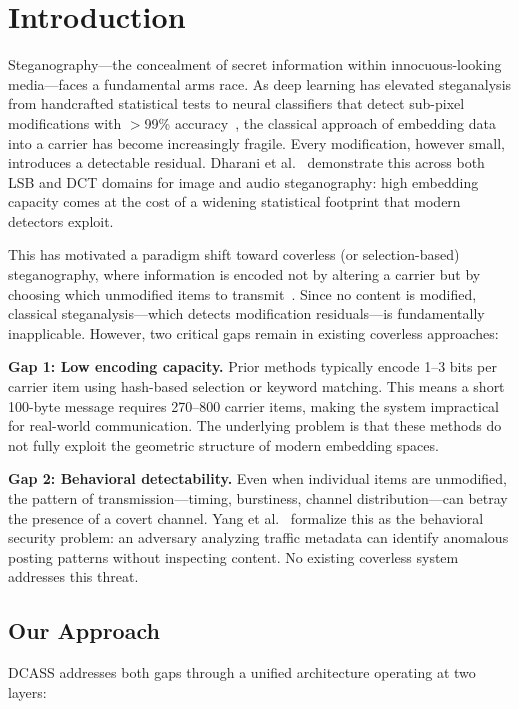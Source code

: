 \documentclass[conference]{IEEEtran}
\begin{document}
\section{Introduction}

Steganography---the concealment of secret information within innocuous-looking media---faces a fundamental arms race. As deep learning has elevated steganalysis from handcrafted statistical tests to neural classifiers that detect sub-pixel modifications with $>$99\% accuracy~\cite{boroumand2018deep,zhang2019run,ye2017deep}, the classical approach of embedding data into a carrier has become increasingly fragile. Every modification, however small, introduces a detectable residual. Dharani et al.~\cite{dharani2021comparative} demonstrate this across both LSB and DCT domains for image and audio steganography: high embedding capacity comes at the cost of a widening statistical footprint that modern detectors exploit.

This has motivated a paradigm shift toward coverless (or selection-based) steganography, where information is encoded not by altering a carrier but by choosing which unmodified items to transmit~\cite{zhou2019coverless}. Since no content is modified, classical steganalysis---which detects modification residuals---is fundamentally inapplicable. However, two critical gaps remain in existing coverless approaches:

\textbf{Gap 1: Low encoding capacity.} Prior methods typically encode 1--3 bits per carrier item using hash-based selection or keyword matching. This means a short 100-byte message requires 270--800 carrier items, making the system impractical for real-world communication. The underlying problem is that these methods do not fully exploit the geometric structure of modern embedding spaces.

\textbf{Gap 2: Behavioral detectability.} Even when individual items are unmodified, the pattern of transmission---timing, burstiness, channel distribution---can betray the presence of a covert channel. Yang et al.~\cite{cabuk2004ip} formalize this as the behavioral security problem: an adversary analyzing traffic metadata can identify anomalous posting patterns without inspecting content. No existing coverless system addresses this threat.

\subsection{Our Approach}

DCASS addresses both gaps through a unified architecture operating at two layers:
\end{document}
